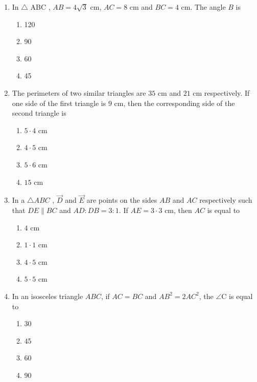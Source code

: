 \begin{enumerate}
\begin{enumerate}[label=(\roman*)]
        \item In $\triangle$ ABC , $AB=4\sqrt{3}$ cm, $AC=8$ cm and $BC=4$ cm. The angle $B$ is

        \begin{enumerate}[label=(\Alph*)]
            \item 120\textdegree
            \item 90\textdegree
            \item 60\textdegree
            \item 45\textdegree
        \end{enumerate}
         
        \item The perimeters of two similar triangles are $35$ cm and $21$ cm respectively.  If one side of the first triangle is $9$ cm, then the corresponding side of the second triangle is 
        
         \begin{enumerate}[label=(\Alph*)]
            \item $5\cdot4$ cm
            \item $4\cdot5$ cm
            \item $5\cdot6$ cm
            \item $15$ cm
        \end{enumerate}
        
        \item In a $\triangle ABC$ , $\vec{D}$ and $\vec{E}$ are points on the sides $AB$ and $AC$ respectively such that $DE\parallel BC$ and $AD:DB=3:1$. If $AE=3\cdot3 $ cm, then $AC$ is equal to
        
        \begin{enumerate}[label=(\Alph*)]
            \item $4$ cm
            \item $1\cdot1$ cm
            \item $4\cdot5$ cm
            \item $5\cdot5$ cm
        \end{enumerate}
        
        \item In an isosceles triangle $ABC$, if $AC=BC$ and $AB^2=2AC^2$, the $\angle$C is equal to
        \begin{enumerate}[label=(\Alph*)]
            \item 30\textdegree
            \item 45\textdegree
            \item 60\textdegree
            \item 90\textdegree
        \end{enumerate}
        \end{enumerate}
\end{enumerate}
